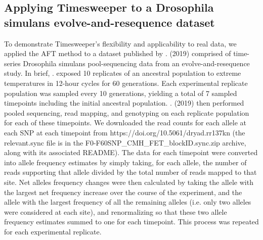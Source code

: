 \subsection{Applying Timesweeper to a Drosophila simulans evolve-and-resequence dataset}
To demonstrate Timesweeper’s flexibility and applicability to real data, we applied the AFT method to a dataset published by \cite{barghiGeneticRedundancyFuels2019}. (2019) comprised of time-series Drosophila simulans pool-sequencing data from an evolve-and-resequence study. In brief, \cite{barghiGeneticRedundancyFuels2019}. exposed 10 replicates of an ancestral population to extreme temperatures in 12-hour cycles for 60 generations. Each experimental replicate population was sampled every 10 generations, yielding a total of 7 sampled timepoints including the initial ancestral population. \cite{barghiGeneticRedundancyFuels2019}. (2019) then performed pooled sequencing, read mapping, and genotyping on each replicate population for each of these timepoints. We downloaded the read counts for each allele at each SNP at each timepoint from https://doi.org/10.5061/dryad.rr137kn (the relevant.sync file is in the F0-F60SNP\_CMH\_FET\_blockID.sync.zip archive, along with its associated README). The data for each timepoint were converted into allele frequency estimates by simply taking, for each allele, the number of reads supporting that allele divided by the total number of reads mapped to that site. Net alleles frequency changes were then calculated by taking the allele with the largest net frequency increase over the course of the experiment, and the allele with the largest frequency of all the remaining alleles (i.e. only two alleles were considered at each site), and renormalizing so that these two allele frequency estimates summed to one for each timepoint. This process was repeated for each experimental replicate. 

